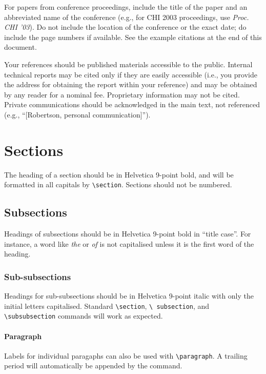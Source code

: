 \documentclass[preprint]{../latex/sigchi-modern}
\begin{document}
For papers from conference proceedings, include the title of the paper and an
abbreviated name of the conference (e.g., for CHI 2003 proceedings, use
\textit{Proc. CHI '03}). Do not include the location of the conference or the
exact date; do include the page numbers if available. See the example
citations at the end of this document.

Your references should be published materials accessible to the public. Internal
technical reports may be cited only if they are easily accessible (i.e., you
provide the address for obtaining the report within your reference) and may be
obtained by any reader for a nominal fee. Proprietary information may not be
cited. Private communications should be acknowledged in the main text, not
referenced (e.g., ``[Robertson, personal communication]'').

\section{Sections}
The heading of a section should be in Helvetica 9-point bold, and will be
formatted in all capitals by \texttt{\textbackslash section}. Sections should
not be numbered.

\subsection{Subsections}
Headings of subsections should be in Helvetica 9-point bold in ``title case''.
For instance, a word like \emph{the} or \emph{of} is not capitalised unless it
is the first word of the heading.

\subsubsection{Sub-subsections}
Headings for sub-subsections should be in Helvetica 9-point italic with only the
initial letters capitalised.
Standard \texttt{\textbackslash sec\-tion}, \texttt{\textbackslash
subsection}, and \texttt{\textbackslash subsubsection} commands will work as
expected.

\paragraph{Paragraph} Labels for individual paragaphs can also be used with
\texttt{\textbackslash paragraph}. A trailing period will automatically be
appended by the command.
\end{document}
